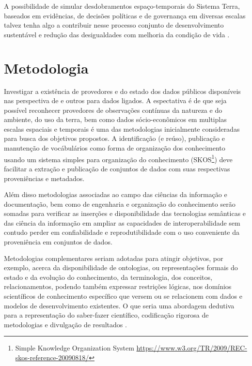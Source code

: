\documentclass[
	11pt,				%
	openany,			%
	oneside,			%
	a4paper,			%
	english,			%
	french,				%
	spanish,			%
	brazil,				%
	]{abntex2}
\begin{document}
A possibilidade de simular desdobramentos espaço-temporais do Sistema Terra, baseados em evidências, de decisões políticas e de governança em diversas escalas talvez tenha algo a contribuir nesse processo conjunto de desenvolvimento sustentável e redução das desigualdades com melhoria da condição de vida \cite{patterson_exploring_2016}.


\chapter{Metodologia}

Investigar a existência de provedores e do estado dos dados públicos disponíveis nas perspectiva de  e outros \cite{bizer_linked_2009} para dados ligados. A espectativa é de que seja possível reconhecer provedores de observações contínuas da natureza e do ambiente, do uso da terra, bem como dados sócio-econômicos em multiplas escalas espaciais e temporais é uma das metodologias inicialmente consideradas para busca dos objetivos propostos. A identificação (e reúso), publicação e manutenção de vocábulários como forma de organização dos conhecimento usando um sistema simples para organização do conhecimento (SKOS\footnote{Simple Knowledge Organization System \url{https://www.w3.org/TR/2009/REC-skos-reference-20090818/}}) deve facilitar a extração e publicação de conjuntos de dados com suas respectivas proveniências e metadados.

Além disso metodologias associadas ao campo das ciências da informação e documentação, bem como de engenharia e organização do conhecimento serão somadas para verificar as inserções e disponibilidade das tecnologias semânticas \cite{tim_berners-lee_james_hendler_and_ora_lassila_semantic_2001,berners-lee_publishing_2001,narock_science_2012,ma_semantic_2015,mattoso_addressing_2016} e das ciência da informação \cite{baker_egy:_2009, fox_rise_2012} em ampliar as capacidades de interoperabilidade \cite{cardoso_semantic_2003} sem contudo perder em confiabilidade \cite{gil_towards_2007} e reprodutibilidade \cite{mattoso_addressing_2016} com o uso conveniente da proveniência \cite{lebo_prov-o:_2013} em conjuntos de dados.

Metodologias complementares seriam adotadas para atingir objetivos, por exemplo, acerca da disponibilidade de ontologias, ou representações formais do estado e da evolução do conhecimento, da terminologia, dos conceitos, relacionamentos, podendo também expressar restrições lógicas, nos domínios scientíficos de conhecimento específico que versem ou se relacionem com dados e modelos de desenvolvimento existentes. O que seria uma abordagem dedutiva para a representação do saber-fazer científico, codificação rigorosa de metodologias e divulgação de resultados \cite{patton_semnext:_2015,mattoso_addressing_2016,diviacco_collaborative_2015}.
\end{document}
